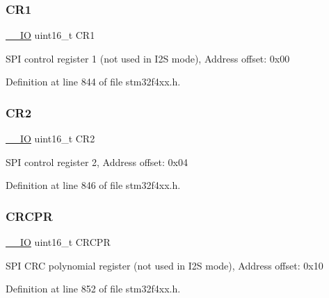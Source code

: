 \subsubsection{\texorpdfstring{C\+R1}{CR1}}
{\footnotesize\ttfamily \hyperlink{group___c_m_s_i_s__core__definitions_gaec43007d9998a0a0e01faede4133d6be}{\+\_\+\+\_\+\+IO} uint16\+\_\+t C\+R1}

S\+PI control register 1 (not used in I2S mode), Address offset\+: 0x00 

Definition at line 844 of file stm32f4xx.\+h.

\mbox{\label{struct_s_p_i___type_def_a2a3e81bd118d1bc52d24a0b0772e6a0c}} 
\subsubsection{\texorpdfstring{C\+R2}{CR2}}
{\footnotesize\ttfamily \hyperlink{group___c_m_s_i_s__core__definitions_gaec43007d9998a0a0e01faede4133d6be}{\+\_\+\+\_\+\+IO} uint16\+\_\+t C\+R2}

S\+PI control register 2, Address offset\+: 0x04 

Definition at line 846 of file stm32f4xx.\+h.

\mbox{\label{struct_s_p_i___type_def_a942ae09a7662bad70ef336f2bed43a19}} 
\subsubsection{\texorpdfstring{C\+R\+C\+PR}{CRCPR}}
{\footnotesize\ttfamily \hyperlink{group___c_m_s_i_s__core__definitions_gaec43007d9998a0a0e01faede4133d6be}{\+\_\+\+\_\+\+IO} uint16\+\_\+t C\+R\+C\+PR}

S\+PI C\+RC polynomial register (not used in I2S mode), Address offset\+: 0x10 

Definition at line 852 of file stm32f4xx.\+h.

\mbox{\label{struct_s_p_i___type_def_a0a1acc0425516ff7969709d118b96a3b}} 
